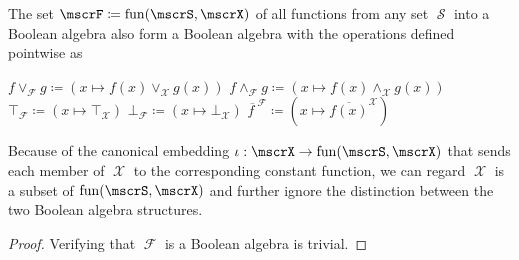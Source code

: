 \begin{proposition}\label{thm:functions_into_boolean_algebra_form_boolean_algebra}
  The set \( \mscrF \coloneqq \Fun(\mscrS, \mscrX) \) of all functions from any set \( \mscrS \) into a Boolean algebra also form a Boolean algebra with the operations defined pointwise as
  \begin{RefList}
     \( f \vee_{\mscrF} g \coloneqq (x \mapsto f(x) \vee_{\mscrX} g(x)) \)
     \( f \wedge_{\mscrF} g \coloneqq (x \mapsto f(x) \wedge_{\mscrX} g(x)) \)
     \( \top_{\mscrF} \coloneqq (x \mapsto \top_{\mscrX}) \)
     \( \bot_{\mscrF} \coloneqq (x \mapsto \bot_{\mscrX}) \)
     \( \overline{f \ }^{\mscrF} \coloneqq (x \mapsto \overline{f(x)}^{\mscrX}) \)
  \end{RefList}

  Because of the canonical embedding \( \iota: \mscrX \to \Fun(\mscrS, \mscrX) \) that sends each member of \( \mscrX \) to the corresponding constant function, we can regard \( \mscrX \) is a subset of \( \Fun(\mscrS, \mscrX) \) and further ignore the distinction between the two Boolean algebra structures.
\end{proposition}
\begin{proof}
  Verifying that \( \mscrF \) is a Boolean algebra is trivial.
\end{proof}

